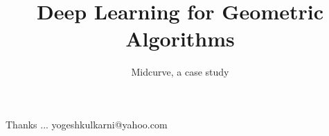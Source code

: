 \documentclass[xcolor=dvipsnames,compress,t,pdf,9pt]{beamer}
\title[\insertframenumber /\inserttotalframenumber]{Deep Learning for Geometric Algorithms}
\subtitle[]{Midcurve, a case study}
\begin{document}
	\begin{frame}
	\titlepage
%
	\end{frame}
	
%	
	
	
	\begin{frame}[c]{}
	Thanks ...
	\vspace{5mm}
	yogeshkulkarni@yahoo.com
	\end{frame}
\end{document}

